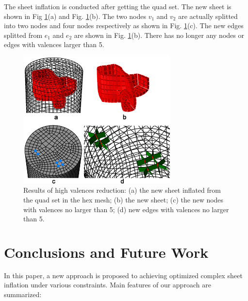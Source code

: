 \documentclass[final,5p,times,twocolumn]{elsarticle}
\begin{document}
The sheet inflation is conducted after getting the quad set. The new sheet is shown in Fig \ref{fig:exam2_sheet}(a) and Fig. \ref{fig:exam2_sheet}(b). The two nodes $v_1$ and $v_2$ are actually splitted into two nodes and four nodes respectively as shown in Fig. \ref{fig:exam2_sheet}(c). The new edges splitted from $e_1$ and $e_2$ are shown in Fig. \ref{fig:exam2_sheet}(b). There has no longer any nodes or edges with valences larger than 5.

\begin{figure}[htbp]
\begin{center}
\includegraphics[width=8cm]{figures/exam2_sheet.png}
\caption{Results of high valences reduction: (a) the new sheet inflated from the quad set in the hex mesh; (b) the new sheet; (c) the new nodes with valences no larger than 5; (d) new edges with valences no larger than 5.}
\label{fig:exam2_sheet}
\end{center}
\end{figure}

\section{Conclusions and Future Work}
In this paper, a new approach is proposed to achieving optimized complex sheet inflation under various constraints. Main features of our approach are summarized:
\end{document}
